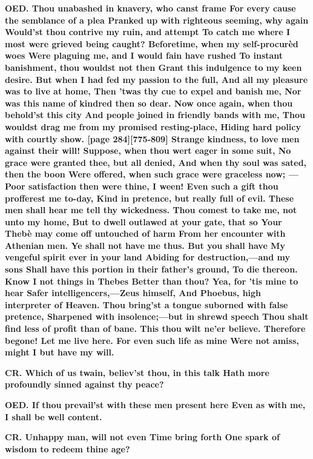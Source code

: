 \documentclass[11pt,letter]{book}
\begin{document}
\par \textbf{OED. Thou unabashed in knavery, who canst frame For every cause the semblance of a plea Pranked up with righteous seeming, why again Would’st thou contrive my ruin, and attempt To catch me where I most were grieved being caught? Beforetime, when my self-procurèd woes Were plaguing me, and I would fain have rushed To instant banishment, thou wouldst not then Grant this indulgence to my keen desire. But when I had fed my passion to the full, And all my pleasure was to live at home, Then ’twas thy cue to expel and banish me, Nor was this name of kindred then so dear. Now once again, when thou behold’st this city And people joined in friendly bands with me, Thou wouldst drag me from my promised resting-place, Hiding hard policy with courtly show. [page 284][775-809] Strange kindness, to love men against their will! Suppose, when thou wert eager in some suit, No grace were granted thee, but all denied, And when thy soul was sated, then the boon Were offered, when such grace were graceless now; —Poor satisfaction then were thine, I ween! Even such a gift thou profferest me to-day, Kind in pretence, but really full of evil. These men shall hear me tell thy wickedness. Thou comest to take me, not unto my home, But to dwell outlawed at your gate, that so Your Thebè may come off untouched of harm From her encounter with Athenian men. Ye shall not have me thus. But you shall have My vengeful spirit ever in your land Abiding for destruction,—and my sons Shall have this portion in their father’s ground, To die thereon. Know I not things in Thebes Better than thou? Yea, for ’tis mine to hear Safer intelligencers,—Zeus himself, And Phoebus, high interpreter of Heaven. Thou bring’st a tongue suborned with false pretence, Sharpened with insolence;—but in shrewd speech Thou shalt find less of profit than of bane. This thou wilt ne’er believe. Therefore begone! Let me live here. For even such life as mine Were not amiss, might I but have my will.}
\par 

\par \textbf{CR. Which of us twain, believ’st thou, in this talk Hath more profoundly sinned against thy peace?}
\par 

\par \textbf{OED. If thou prevail’st with these men present here Even as with me, I shall be well content.}
\par 

\par \textbf{CR. Unhappy man, will not even Time bring forth One spark of wisdom to redeem thine age?}
\par 
\end{document}
